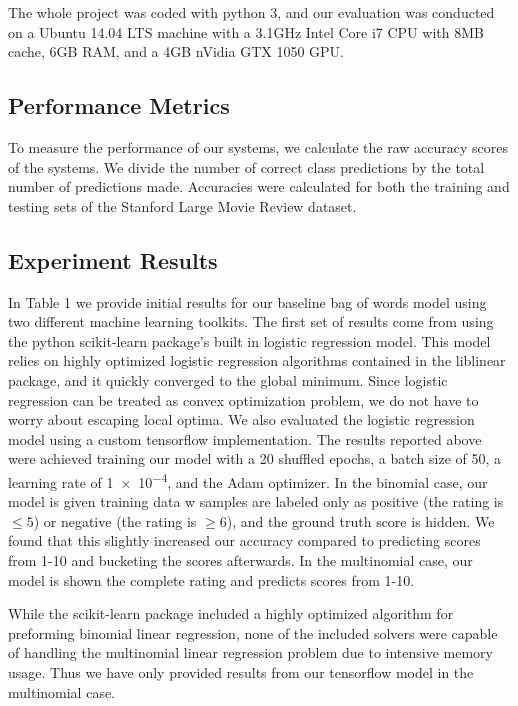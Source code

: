 \documentclass[conference]{IEEEtran}
\begin{document}
    The whole project was coded with python 3, and our evaluation was conducted on
    a Ubuntu 14.04 LTS machine with a 3.1GHz Intel Core i7 CPU with 8MB cache,
    6GB RAM, and a 4GB nVidia GTX 1050 GPU.
    
\subsection{Performance Metrics}
    To measure the performance of our systems, we calculate the raw accuracy
    scores of the systems. We divide the number of correct class predictions
    by the total number of predictions made. Accuracies were calculated
    for both the training and testing sets of the Stanford Large Movie Review dataset.
    
\subsection{Experiment Results}
    In Table 1 we provide initial results for our baseline bag of words model using
    two different machine learning toolkits. The first set of results come from
    using the python scikit-learn package's built in logistic regression model.
    This model relies on highly optimized logistic regression algorithms
    contained in the liblinear \cite{Fan:2008:LLL:1390681.1442794} package,
    and it quickly converged to the global minimum. Since logistic regression
    can be treated as convex optimization problem, we do not have to worry 
    about escaping local optima. We also evaluated the logistic regression
    model using a custom tensorflow implementation. The results reported
    above were achieved training our model with a 20 shuffled epochs, a
    batch size of 50, a learning rate of \num{1e-4}, and the Adam optimizer.
    In the binomial case, our model is given training data w samples are
    labeled only as positive (the rating is $\leq 5$) or negative (the rating is
    $\geq 6$), and the ground truth score is hidden. We found that this slightly
    increased our accuracy compared to predicting scores from 1-10 and
    bucketing the scores afterwards. In the multinomial case, our model is
    shown the complete rating and predicts scores from 1-10.
    
    While the scikit-learn package included a highly optimized algorithm for
    preforming binomial linear regression, none of the included solvers were
    capable of handling the multinomial linear regression problem due to intensive
    memory usage. Thus we have only provided results from our tensorflow
    model in the multinomial case.
    
\end{document}
